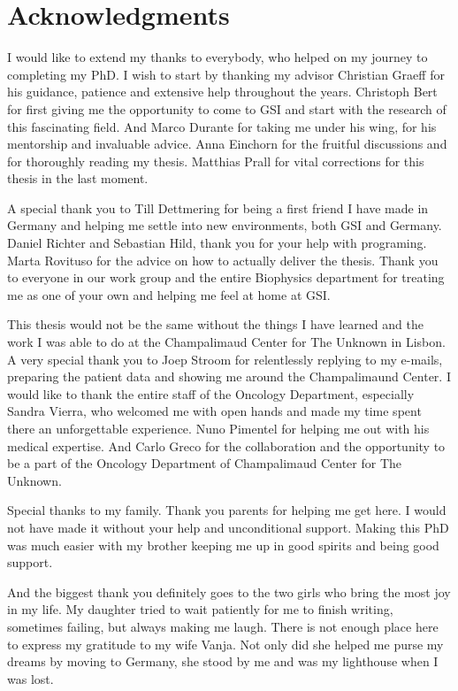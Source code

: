 

\chapter*{Acknowledgments}

I would like to extend my thanks to everybody, who helped on my journey to completing my PhD.
I wish to start by thanking my advisor Christian Graeff for his guidance, patience and extensive help throughout the years. 
Christoph Bert for first giving me the opportunity to come to GSI and start with the research of this fascinating field. And Marco Durante for taking me under his wing, for his mentorship and invaluable advice.  
Anna Einchorn for the fruitful discussions and for thoroughly reading my thesis. Matthias Prall for vital corrections for this thesis in the last moment.

A special thank you to Till Dettmering for being a first friend I have made in Germany and helping me settle into new environments, both GSI and Germany. Daniel Richter and Sebastian Hild, thank you for your help with programing.
Marta Rovituso for the advice on how to actually deliver the thesis. 
Thank you to everyone in our work group and the entire Biophysics department for treating me as one of your own and helping me feel at home at GSI. 

This thesis would not be the same without the things I have learned and the work I was able to do at the Champalimaud Center for The Unknown in Lisbon.
A very special thank you to Joep Stroom for relentlessly replying to my e-mails, preparing the patient data and showing me around the Champalimaund Center.
I would like to thank the entire staff of the Oncology Department, especially Sandra Vierra, who welcomed me with open hands and made my time spent there an unforgettable experience. 
Nuno Pimentel for helping me out with his medical expertise. And Carlo Greco for the collaboration and the opportunity to be a part of the Oncology Department of Champalimaud Center for The Unknown.

Special thanks to my family. Thank you parents for helping me get here. I would not have made it without your help and unconditional support. Making this PhD was much easier with my brother keeping me up in good spirits
and being good support.

And the biggest thank you definitely goes to the two girls who bring the most joy in my life. 
My daughter tried to wait patiently for me to finish writing, sometimes failing, but always making me laugh.
There is not enough place here to express my gratitude to my wife Vanja. Not only did she helped me purse my dreams by moving to Germany, she stood by me and was my lighthouse when I was lost.


